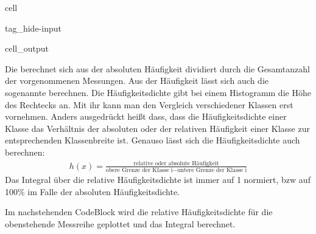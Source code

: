 \documentclass[letterpaper,10pt,english]{jupyterBook}
\begin{document}
\begin{sphinxuseclass}{cell}
\begin{sphinxuseclass}{tag_hide-input}\begin{sphinxVerbatimOutput}

\begin{sphinxuseclass}{cell_output}
\noindent{}

\end{sphinxuseclass}\end{sphinxVerbatimOutput}

\end{sphinxuseclass}
\end{sphinxuseclass}
\sphinxAtStartPar
Die  berechnet sich aus der absoluten Häufigkeit dividiert durch die Gesamtanzahl der vorgenommenen Messungen.
Aus der Häufigkeit lässt sich auch die sogenannte  berechnen.
Die Häufigkeitsdichte gibt bei einem Histogramm die Höhe des Rechtecks an. Mit ihr kann man den Vergleich verschiedener Klassen erst vornehmen. Anders ausgedrückt heißt dass, dass die Häufigkeitsdichte einer Klasse das Verhältnis der absoluten oder der relativen Häufigkeit einer Klasse zur entsprechenden Klassenbreite ist. Genauso lässt sich die Häufigkeitsdichte auch berechnen:
\begin{equation*}
\begin{split} h(x) = \frac{\textrm{relative oder absolute Häufigkeit}}{\textrm{obere Grenze der Klasse i} - \textrm{untere Grenze der Klasse i}} \end{split}
\end{equation*}
\sphinxAtStartPar
Das Integral über die relative Häufigkeitsdichte ist immer auf 1 normiert, bzw auf 100\% im Falle der absoluten Häufigkeitsdichte.

\sphinxAtStartPar
Im nachstehenden Code\sphinxhyphen{}Block wird die relative Häufigkeitsdichte für die obenstehende Messreihe geplottet und das Integral berechnet.
\end{document}
